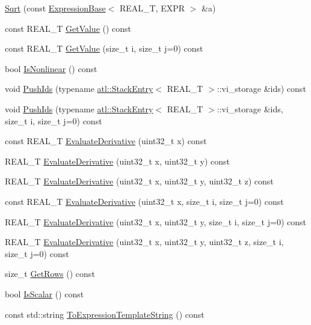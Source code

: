 \begin{DoxyCompactItemize}
\item 
\hyperlink{structatl_1_1_sqrt_ac8e3a110ca40bdf839670082dc5e4ef0}{Sqrt} (const \hyperlink{structatl_1_1_expression_base}{Expression\+Base}$<$ R\+E\+A\+L\+\_\+\+T, E\+X\+P\+R $>$ \&a)
\item 
const R\+E\+A\+L\+\_\+\+T \hyperlink{structatl_1_1_sqrt_a6c0d48a0e6e86b70b7514b750fcb30be}{Get\+Value} () const 
\item 
const R\+E\+A\+L\+\_\+\+T \hyperlink{structatl_1_1_sqrt_a3b8ddd52b949a35e968943d3061895d8}{Get\+Value} (size\+\_\+t i, size\+\_\+t j=0) const 
\item 
bool \hyperlink{structatl_1_1_sqrt_a476ac8bdcd0ce6652813615910dc9447}{Is\+Nonlinear} () const 
\item 
void \hyperlink{structatl_1_1_sqrt_a6b88eb004324b1c5ce917b240964b84b}{Push\+Ids} (typename \hyperlink{structatl_1_1_stack_entry}{atl\+::\+Stack\+Entry}$<$ R\+E\+A\+L\+\_\+\+T $>$\+::vi\+\_\+storage \&ids) const 
\item 
void \hyperlink{structatl_1_1_sqrt_a5aa440d7850741d3f82e4c82156bdc57}{Push\+Ids} (typename \hyperlink{structatl_1_1_stack_entry}{atl\+::\+Stack\+Entry}$<$ R\+E\+A\+L\+\_\+\+T $>$\+::vi\+\_\+storage \&ids, size\+\_\+t i, size\+\_\+t j=0) const 
\item 
const R\+E\+A\+L\+\_\+\+T \hyperlink{structatl_1_1_sqrt_ad947337b0d33abfb9fe7e671a3a6b01b}{Evaluate\+Derivative} (uint32\+\_\+t x) const 
\item 
R\+E\+A\+L\+\_\+\+T \hyperlink{structatl_1_1_sqrt_a96f53e404e169b1c69d063fefcb8176b}{Evaluate\+Derivative} (uint32\+\_\+t x, uint32\+\_\+t y) const 
\item 
R\+E\+A\+L\+\_\+\+T \hyperlink{structatl_1_1_sqrt_ab6c9c3321b4f641ea4059c9c26308238}{Evaluate\+Derivative} (uint32\+\_\+t x, uint32\+\_\+t y, uint32\+\_\+t z) const 
\item 
const R\+E\+A\+L\+\_\+\+T \hyperlink{structatl_1_1_sqrt_a17d66a2d5c04e28ae1f57cfd1bf68c04}{Evaluate\+Derivative} (uint32\+\_\+t x, size\+\_\+t i, size\+\_\+t j=0) const 
\item 
R\+E\+A\+L\+\_\+\+T \hyperlink{structatl_1_1_sqrt_affa365598724b7e0f8f0ef2d2653af9f}{Evaluate\+Derivative} (uint32\+\_\+t x, uint32\+\_\+t y, size\+\_\+t i, size\+\_\+t j=0) const 
\item 
R\+E\+A\+L\+\_\+\+T \hyperlink{structatl_1_1_sqrt_abe56609f5a775fcba0d98645013e30bf}{Evaluate\+Derivative} (uint32\+\_\+t x, uint32\+\_\+t y, uint32\+\_\+t z, size\+\_\+t i, size\+\_\+t j=0) const 
\item 
size\+\_\+t \hyperlink{structatl_1_1_sqrt_abfa08333fc04697ea542b1399a4aa491}{Get\+Rows} () const 
\item 
bool \hyperlink{structatl_1_1_sqrt_aa075ea8b91dbb80539905f5803df09fd}{Is\+Scalar} () const 
\item 
const std\+::string \hyperlink{structatl_1_1_sqrt_a6459cdf71df9ccae80fbf884fa1d2808}{To\+Expression\+Template\+String} () const 
\end{DoxyCompactItemize}
